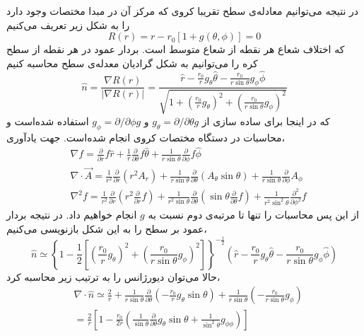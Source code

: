 در نتیجه می‌توانیم معادله‌ی سطح تقریبا کروی که مرکز آن در مبدا مختصات وجود دارد را به شکل زیر تعریف می‌کنیم
\begin{equation}
R(r)= r-r_0\left[1+g(\theta,\phi)\right]=0
\label{eq:radiusdef}
\end{equation}
که اختلاف شعاع هر نقطه از شعاع متوسط است. بردار عمود در هر نقطه از سطح کره را می‌توانیم به شکل گرادیان معدله‌ی سطح محاسبه کنیم
\begin{equation}
\hat n = \frac{\nabla R(r)}{|\nabla R(r)|}= \frac{\hat r-\frac{r_0}{r}g_\theta \hat\theta-\frac{r_0}{r\sin\theta}g_\phi\hat\phi }{\sqrt{1+\left(\frac{r_0}{r}g_\theta\right)^2+\left(\frac{r_0}{r\sin\theta}g_\phi\right)^2 }}
\end{equation}
که در اینجا برای ساده سازی از
$g_\theta=\partial/\partial\theta g$
و
$g_\phi=\partial/\partial\phi g$
استفاده شده‌است و محاسبات در دستگاه مختصات کروی انجام شده‌است.
جهت یادآوری،
\begin{equation}
\begin{aligned}
&\nabla f =\frac{\partial}{\partial r}f\hat r + \frac{1}{r} \frac{\partial}{\partial\theta}f\hat\theta+ \frac{1}{r\sin\theta} \frac{\partial}{\partial\phi}f\hat\phi\\
&\nabla\cdot \vec A =\frac{1}{r^2}\frac{\partial}{\partial r}(r^2A_r)+ \frac{1}{r\sin\theta} \frac{\partial}{\partial\theta}(A_\theta\sin\theta)+ \frac{1}{r\sin\theta} \frac{\partial}{\partial\phi}A_\phi\\
&\nabla^2f =\frac{1}{r^2}\frac{\partial}{\partial r}\left(r^2\frac{\partial}{\partial r}f\right)+ \frac{1}{r^2\sin\theta} \frac{\partial}{\partial\theta}\left(\sin\theta\frac{\partial}{\partial\theta}f\right)+ \frac{1}{r^2\sin^2\theta} \frac{\partial^2}{\partial\phi^2}f
\end{aligned}
\end{equation}
از این پس محاسبات را تنها تا مرتبه‌ی دوم نسبت به $g$ 
انجام خواهیم داد. در نتیجه بردار عمود بر سطح را به این شکل بازنویسی می‌کنیم،
\begin{equation}
\hat n \simeq\left\{1-\frac{1}{2}\left[\left(\frac{r_0}{r}g_\theta\right)^2+\left(\frac{r_0}{r\sin\theta}g_\phi\right)^2 \right]\right\}^{-\frac{1}{2}}\left( \hat r-\frac{r_0}{r}g_\theta \hat\theta-\frac{r_0}{r\sin\theta}g_\phi\hat\phi \right)
\end{equation}
حالا می‌توان دیورژانس را به ترتیب زیر محاسبه کرد،
\begin{equation}
\begin{aligned}
&\nabla\cdot\hat n \simeq \frac{2}{r}+\frac{1}{r\sin\theta}\frac{\partial}{\partial\theta}\left(-\frac{r_0}{r}g_\theta\sin\theta\right)+\frac{1}{r\sin\theta}\left(-\frac{r_0}{r\sin\theta}g_\phi\right)\\
&=\frac{2}{r}\left[1-\frac{r_0}{2r}\left(\frac{1}{\sin\theta}\frac{\partial}{\partial\theta}g_\theta\sin\theta+\frac{1}{\sin^2\theta}g_{\phi\phi}\right)\right]
\label{eq:divn}
\end{aligned}
\end{equation}
